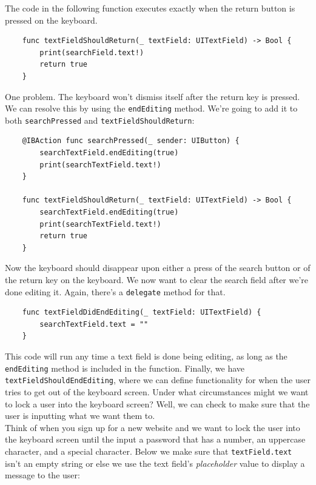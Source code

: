 \documentclass[11pt, letterpaper]{article}
\begin{document}
The code in the following function executes exactly when the return button is pressed on the keyboard.

\begin{verbatim}
    func textFieldShouldReturn(_ textField: UITextField) -> Bool {
        print(searchField.text!)
        return true
    }
\end{verbatim}

One problem. The keyboard won't dismiss itself after the return key is pressed. We can resolve this by using the 
\verb+endEditing+ method. We're going to add it to both \verb+searchPressed+ and \verb+textFieldShouldReturn+:

\begin{verbatim}
    @IBAction func searchPressed(_ sender: UIButton) {
        searchTextField.endEditing(true)
        print(searchTextField.text!)
    }

    func textFieldShouldReturn(_ textField: UITextField) -> Bool {
        searchTextField.endEditing(true)
        print(searchTextField.text!)
        return true
    }
\end{verbatim}

Now the keyboard should disappear upon either a press of the search button or of the return key on the keyboard. We
now want to clear the search field after we're done editing it. Again, there's a \verb+delegate+ method for that. \\

\begin{verbatim}
    func textFieldDidEndEditing(_ textField: UITextField) {
        searchTextField.text = ""
    }
\end{verbatim}

This code will run any time a text field is done being editing, as long as the \verb+endEditing+ method is included in the
function. Finally, we have \verb+textFieldShouldEndEditing+, where we can define functionality for when the user tries
to get out of the keyboard screen. Under what circumstances might we want to lock a user into the keyboard screen?
Well, we can check to make sure that the user is inputting what we want them to. \\

Think of when you sign up for a new website and we want to lock the user into the keyboard screen until the input a 
password that has a number, an uppercase character, and a special character. Below we make sure that 
\verb+textField.text+ isn't an empty string or else we use the text field's \emph{placeholder} value 
to display a message to the user:
\end{document}
